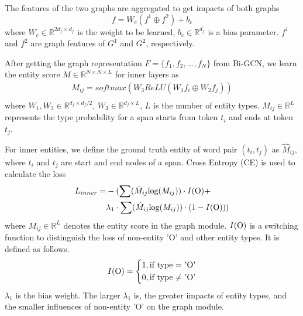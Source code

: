 \documentclass[11pt,a4paper]{article}
\begin{document}
The features of the two graphs are aggregated to get impacts of both graphs
\begin{equation}
    f = W_c(f^1 \oplus f^2) + b_c
\end{equation}
where $W_c \in \mathbb{R}^{2d_f \times d_f}$ is the weight to be learned, $b_c \in \mathbb{R}^{d_f}$ is a bias parameter. $f^1$ and $f^2$ are graph features of $G^1$ and $G^2$, respectively.

After getting the graph representation $F = \{f_1, f_2, ..., f_N\}$ from Bi-GCN, we learn the entity score $M \in \mathbb{R}^{N \times N \times L}$ for inner layers as
\begin{equation}
    \begin{aligned}
        M_{ij} = softmax(W_3ReLU(W_1f_i \oplus W_2f_j)) \\
    \end{aligned}
\end{equation}
where $W_{1}, W_2 \in \mathbb{R}^{d_f \times {d_f}/2}$, $W_{3}\in \mathbb{R}^{d_f \times L}$, $L$ is the number of entity types. $M_{ij} \in \mathbb{R}^L$ represents the type probability for a span starts from token $t_i$ and ends at token $t_j$.

For inner entities, we define the ground truth entity of word pair $(t_i, t_j)$ as $\hat{M}_{ij}$, where $t_i$ and $t_j$ are start and end nodes of a span.
Cross Entropy (CE) is used to calculate the loss
\begin{equation}
    \begin{aligned}
        L_{inner} = & - ( \sum(\hat{M}_{ij}\text{log}(M_{ij})) \cdot I(\rm O) + \\ 
        & \lambda_1 \cdot \sum(\hat{M}_{ij}\text{log}(M_{ij})) \cdot (1 - I(\rm O)))
    \end{aligned}
\end{equation}
where $M_{ij} \in \mathbb{R}^{L}$ denotes the entity score in the graph module. $I(\rm O)$ is a switching function to distinguish the loss of non-entity 'O' and other entity types. It is defined as follows.
\begin{equation}  
I(\rm O) =\left\{
\begin{aligned}
1, \text{if type $=$ '\rm O'} \\
0, \text{if type $\neq$ '\rm O'}
\end{aligned}
\right.  
\end{equation} 
$\lambda_1$ is the bias weight. The larger $\lambda_1$ is, the greater impacts of entity types, and the smaller influences of non-entity 'O' on the graph module.
\end{document}

